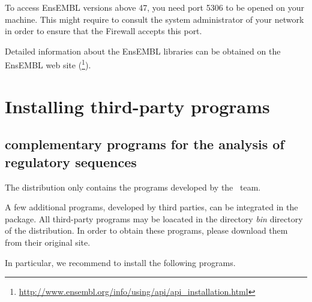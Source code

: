 \documentclass[12pt,a4paper, oneside]{scrreprt} %
\begin{document}
To access EnsEMBL versions above 47, you need port 5306 to be opened
on your machine. This might require to consult the system
administrator of your network in order to ensure that the Firewall
accepts this port.

Detailed information about the EnsEMBL libraries can be obtained on
the EnsEMBL web site
(\footnote{\url{http://www.ensembl.org/info/using/api/api\_installation.html}}).















\chapter{Installing third-party programs}

\section{complementary programs for the analysis of regulatory
  sequences}

The \RSAT distribution only contains the programs developed by the
\RSAT \ team. 

A few additional programs, developed by third parties, can be
integrated in the package. All third-party programs may be loacated in
the directory \emph{bin} directory of the \RSAT distribution. In order
to obtain these programs, please download them from their original
site.

In particular, we recommend to install the following programs.
\end{document}
